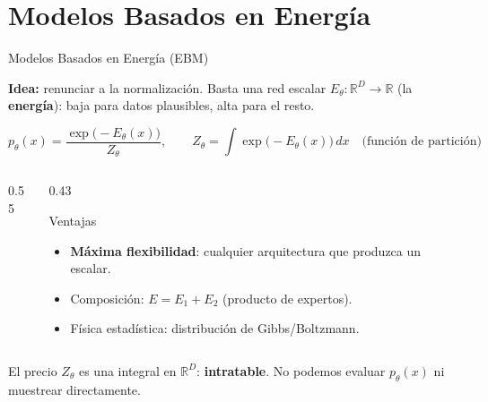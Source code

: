 \documentclass[aspectratio=169, 10pt]{beamer}
\providecommand{\R}{\mathbb{R}}
\newcommand{\formula}[1]{%
	\begin{tcolorbox}[colback=UCMBlue!8, colframe=UCMBlue, arc=4pt,
		boxsep=2pt, left=6pt, right=6pt, top=3pt, bottom=3pt]
		#1
	\end{tcolorbox}
}
\begin{document}
\section{Modelos Basados en Energ\'ia}

\begin{frame}[shrink]{Modelos Basados en Energ\'ia (EBM)}

	\textbf{Idea:} renunciar a la normalizaci\'on. Basta una red escalar $E_\theta : \R^D \to \R$ (la \textbf{energ\'ia}): baja para datos plausibles, alta para el resto.

	\formula{
		\[
		p_\theta(x) = \frac{\exp\big(-E_\theta(x)\big)}{Z_\theta},
		\qquad
		Z_\theta = \int \exp\big(-E_\theta(x)\big)\, dx
		\quad\text{(funci\'on de partici\'on)}
		\]
	}

	\begin{columns}[c]
		\begin{column}{0.55\textwidth}
			\begin{center}
			\end{center}
		\end{column}

		\begin{column}{0.43\textwidth}
			\begin{block}{Ventajas}
				\small
				\begin{itemize}
					\item \textbf{M\'axima flexibilidad}: cualquier arquitectura que produzca un escalar.
					\item Composici\'on: $E = E_1 + E_2$ (producto de expertos).
					\item F\'isica estad\'istica: distribuci\'on de Gibbs/Boltzmann.
				\end{itemize}
			\end{block}
		\end{column}
	\end{columns}

	\vspace{0.1cm}

	\begin{alertblock}{El precio}
		$Z_\theta$ es una integral en $\R^D$: \textbf{intratable}. No podemos evaluar $p_\theta(x)$ ni muestrear directamente.
	\end{alertblock}

\end{frame}
\end{document}
